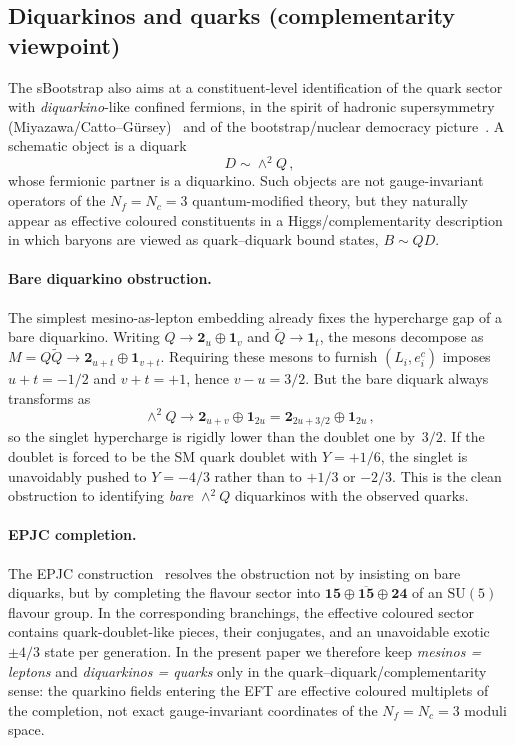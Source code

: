 \documentclass[11pt,a4paper]{article}
\newcommand{\SU}{\mathrm{SU}}
\newcommand{\Nf}{N_f}
\newcommand{\Nc}{N_c}
\begin{document}
\subsection{Diquarkinos and quarks (complementarity viewpoint)}
\label{sec:sbootstrap_diquarks}

The sBootstrap also aims at a constituent-level identification of the quark
sector with \emph{diquarkino}-like confined fermions, in the spirit of
hadronic supersymmetry (Miyazawa/Catto--G\"ursey)~\cite{Miyazawa:1966,CattoGursey:1985,CattoGursey:1988}
and of the bootstrap/nuclear democracy picture~\cite{Chew:1962}.  A schematic object is a diquark
\begin{equation}
  D \sim \wedge^2 Q\,,
  \label{eq:diquark}
\end{equation}
whose fermionic partner is a diquarkino.  Such objects are not gauge-invariant
operators of the $\Nf=\Nc=3$ quantum-modified theory, but they naturally appear as
effective coloured constituents in a Higgs/complementarity description~\cite{FradkinShenker:1979,BanksRabinovici:1979} in
which baryons are viewed as quark--diquark bound states, $B\sim QD$.

\paragraph{Bare diquarkino obstruction.}
The simplest mesino-as-lepton embedding already fixes the hypercharge gap of a
bare diquarkino.  Writing
$Q\rightarrow \mathbf{2}_u\oplus \mathbf{1}_v$ and
$\tilde Q\rightarrow \mathbf{1}_t$, the mesons decompose as
$M=Q\tilde Q\rightarrow \mathbf{2}_{u+t}\oplus \mathbf{1}_{v+t}$.
Requiring these mesons to furnish $(L_i,e_i^c)$ imposes
$u+t=-1/2$ and $v+t=+1$, hence $v-u=3/2$.
But the bare diquark always transforms as
\begin{equation}
  \wedge^2 Q \rightarrow \mathbf{2}_{u+v}\oplus \mathbf{1}_{2u}
  = \mathbf{2}_{2u+3/2}\oplus \mathbf{1}_{2u}\,,
  \label{eq:diquark_obstruction}
\end{equation}
so the singlet hypercharge is rigidly lower than the doublet one by~$3/2$.
If the doublet is forced to be the SM quark doublet with $Y=+1/6$, the singlet
is unavoidably pushed to $Y=-4/3$ rather than to $+1/3$ or $-2/3$.
This is the clean obstruction to identifying \emph{bare} $\wedge^2 Q$
diquarkinos with the observed quarks.

\paragraph{EPJC completion.}
The EPJC construction~\cite{Rivero:2024epjc} resolves the obstruction not by
insisting on bare diquarks, but by completing the flavour sector into
$\mathbf{15}\oplus\overline{\mathbf{15}}\oplus\mathbf{24}$ of an $\SU(5)$
flavour group.  In the corresponding branchings, the effective coloured sector
contains quark-doublet-like pieces, their conjugates, and an unavoidable exotic
$\pm4/3$ state per generation.  In the present paper we therefore keep
\emph{mesinos = leptons} and \emph{diquarkinos = quarks} only in the
quark--diquark/complementarity sense: the quarkino fields entering the EFT are
effective coloured multiplets of the completion, not exact gauge-invariant
coordinates of the $\Nf=\Nc=3$ moduli space.
\end{document}
